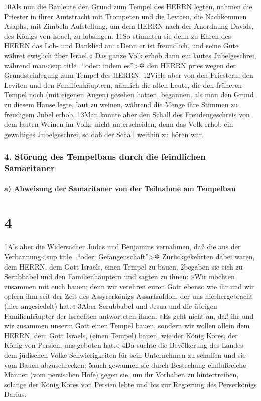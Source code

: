 10Als nun die Bauleute den Grund zum Tempel des HERRN legten, nahmen die
Priester in ihrer Amtstracht mit Trompeten und die Leviten, die
Nachkommen Asaphs, mit Zimbeln Aufstellung, um dem HERRN nach der
Anordnung Davids, des Königs von Israel, zu lobsingen. 11So stimmten sie
denn zu Ehren des HERRN das Lob- und Danklied an: »Denn er ist
freundlich, und seine Güte währet ewiglich über Israel.« Das ganze Volk
erhob dann ein lautes Jubelgeschrei, während man\textless sup
title=``oder: indem es''\textgreater✲ den HERRN pries wegen der
Grundsteinlegung zum Tempel des HERRN. 12Viele aber von den Priestern,
den Leviten und den Familienhäuptern, nämlich die alten Leute, die den
früheren Tempel noch (mit eigenen Augen) gesehen hatten, begannen, als
man den Grund zu diesem Hause legte, laut zu weinen, während die Menge
ihre Stimmen zu freudigem Jubel erhob. 13Man konnte aber den Schall des
Freudengeschreis von dem lauten Weinen im Volke nicht unterscheiden,
denn das Volk erhob ein gewaltiges Jubelgeschrei, so daß der Schall
weithin zu hören war.

\hypertarget{stuxf6rung-des-tempelbaus-durch-die-feindlichen-samaritaner}{%
\subsubsection{4. Störung des Tempelbaus durch die feindlichen
Samaritaner}\label{stuxf6rung-des-tempelbaus-durch-die-feindlichen-samaritaner}}

\hypertarget{a-abweisung-der-samaritaner-von-der-teilnahme-am-tempelbau}{%
\paragraph{a) Abweisung der Samaritaner von der Teilnahme am
Tempelbau}\label{a-abweisung-der-samaritaner-von-der-teilnahme-am-tempelbau}}

\hypertarget{section-3}{%
\section{4}\label{section-3}}

1Als aber die Widersacher Judas und Benjamins vernahmen, daß die aus der
Verbannung\textless sup title=``oder: Gefangenschaft''\textgreater✲
Zurückgekehrten dabei waren, dem HERRN, dem Gott Israels, einen Tempel
zu bauen, 2begaben sie sich zu Serubbabel und den Familienhäuptern und
sagten zu ihnen: »Wir möchten zusammen mit euch bauen; denn wir verehren
euren Gott ebenso wie ihr und wir opfern ihm seit der Zeit des
Assyrerkönigs Assarhaddon, der uns hierhergebracht (hier angesiedelt)
hat.« 3Aber Serubbabel und Jesua und die übrigen Familienhäupter der
Israeliten antworteten ihnen: »Es geht nicht an, daß ihr und wir
zusammen unserm Gott einen Tempel bauen, sondern wir wollen allein dem
HERRN, dem Gott Israels, (einen Tempel) bauen, wie der König Kores, der
König von Persien, uns geboten hat.« 4Da suchte die Bevölkerung des
Landes dem jüdischen Volke Schwierigkeiten für sein Unternehmen zu
schaffen und sie vom Bauen abzuschrecken; 5auch gewannen sie durch
Bestechung einflußreiche Männer (vom persischen Hofe) gegen sie, um ihr
Vorhaben zu hintertreiben, solange der König Kores von Persien lebte und
bis zur Regierung des Perserkönigs Darius.

